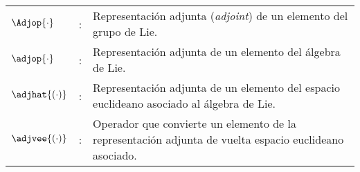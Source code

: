 \begin{notation}
\begin{center}
\begin{tabular}{l c p{12cm}}
		$\Adjop{\cdot}$					& : & Representación adjunta (\emph{adjoint}) de un elemento del grupo de Lie.
		\\
		$\adjop{\cdot}$					& : & Representación adjunta de un elemento del álgebra de Lie.
		\\
		$\adjhat{\left( \cdot \right)}$	& : & Representación adjunta de un elemento del espacio euclideano asociado al álgebra de Lie.
		\\
		$\adjvee{\left( \cdot \right)}$	& : & Operador que convierte un elemento de la representación adjunta de vuelta espacio euclideano asociado.
		\\
	\end{tabular} 
\end{center}
\end{notation}

